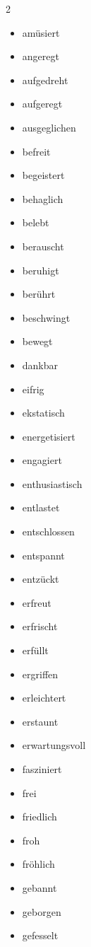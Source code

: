 \begin{multicols}{2}
    \begin{itemize}
        \item amüsiert
        \item angeregt
        \item aufgedreht
        \item aufgeregt
        \item ausgeglichen
        \item befreit
        \item begeistert
        \item behaglich
        \item belebt
        \item berauscht
        \item beruhigt
        \item berührt
        \item beschwingt
        \item bewegt
        \item dankbar
        \item eifrig
        \item ekstatisch
        \item energetisiert
        \item engagiert
        \item enthusiastisch
        \item entlastet
        \item entschlossen
        \item entspannt
        \item entzückt
        \item erfreut
        \item erfrischt
        \item erfüllt
        \item ergriffen
        \item erleichtert
        \item erstaunt
        \item erwartungsvoll
        \item fasziniert
        \item frei
        \item friedlich
        \item froh
        \item fröhlich
        \item gebannt
        \item geborgen
        \item gefesselt

\end{itemize}
\end{multicols}
